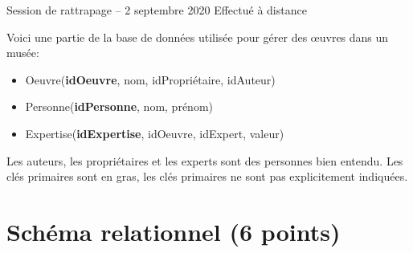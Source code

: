 %
{Session de rattrapage -- 2 septembre 2020}%
{Effectué à distance}%


Voici une partie de la base de données utilisée pour gérer des {\oe}uvres
dans un musée:
 
\begin{itemize}
  \item Oeuvre(\textbf{idOeuvre}, nom, idPropriétaire, idAuteur)
  \item Personne(\textbf{idPersonne}, nom, prénom)
  \item Expertise(\textbf{idExpertise}, idOeuvre, idExpert,  valeur)
\end{itemize}

Les auteurs, les propriétaires et les experts sont des personnes bien entendu. Les clés primaires sont en gras,
les clés primaires ne sont pas explicitement indiquées.


\section{Schéma relationnel (6 points)}

